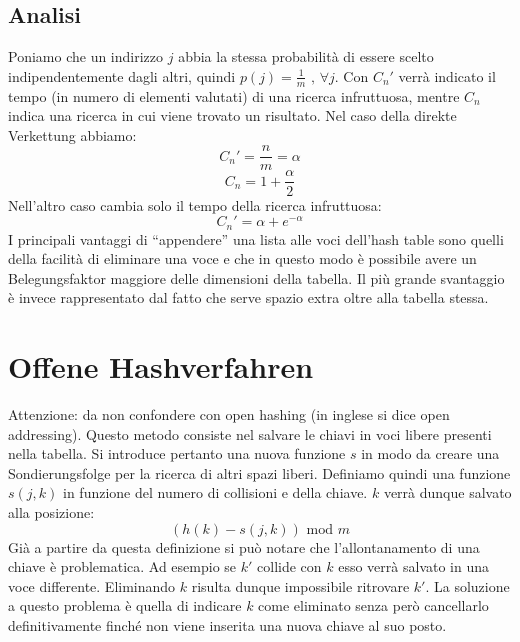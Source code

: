 \documentclass[a4paper]{book}
\begin{document}
\subsection*{Analisi}
Poniamo che un indirizzo $j$ abbia la stessa probabilità di essere scelto indipendentemente dagli altri, quindi $p(j)=\frac{1}{m} \mbox{ , } \forall j$. Con $C_n'$ verrà indicato il tempo (in numero di elementi valutati) di una ricerca infruttuosa, mentre $C_n$ indica una ricerca in cui viene trovato un risultato. Nel caso della direkte Verkettung abbiamo:
$$ C_n '=\frac{n}{m}=\alpha $$
$$ C_n = 1+\frac{\alpha}{2} $$
Nell'altro caso cambia solo il tempo della ricerca infruttuosa:
$$C_n '=\alpha + e^{-\alpha} $$
I principali vantaggi di ``appendere'' una lista alle voci dell'hash table sono quelli della facilità di eliminare una voce e che in questo modo è possibile avere un Belegungsfaktor maggiore delle dimensioni della tabella. Il più grande svantaggio è invece rappresentato dal fatto che serve spazio extra oltre alla tabella stessa.
\section{Offene Hashverfahren}
Attenzione: da non confondere con open hashing (in inglese si dice open addressing). Questo metodo consiste nel salvare le chiavi in voci libere presenti nella tabella. Si introduce pertanto una nuova funzione $s$ in modo da creare una Sondierungsfolge per la ricerca di altri spazi liberi. Definiamo quindi una funzione $s(j,k)$ in funzione del numero di collisioni e della chiave. $k$ verrà dunque salvato alla posizione:
$$(h(k)-s(j,k))\mbox{ mod }m$$
Già a partire da questa definizione si può notare che l'allontanamento di una chiave è problematica. Ad esempio se $k'$ collide con $k$ esso verrà salvato in una voce differente. Eliminando $k$ risulta dunque impossibile ritrovare $k'$. La soluzione a questo problema è quella di indicare $k$ come eliminato senza però cancellarlo definitivamente finché non viene inserita una nuova chiave al suo posto.
\end{document}
